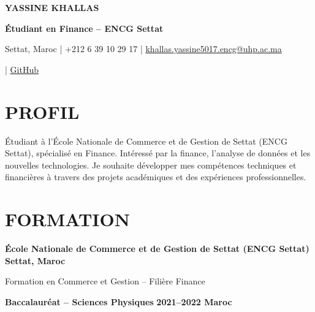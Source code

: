 \documentclass[10pt,a4paper]{article}
\begin{document}

\begin{center}

{\Huge\textbf{YASSINE KHALLAS}}

\vspace{3pt}

{\large\textbf{Étudiant en Finance -- ENCG Settat}}

\vspace{7pt}

Settat, Maroc
\quad | \quad
+212 6 39 10 29 17
\quad | \quad
\href{mailto:votre.email@gmail.com}{khallas.yassine5017.encg@uhp.ac.ma}

\vspace{2pt}

\quad | \quad
\href{https://github.com/votreprofil}{GitHub}

\end{center}

\section{PROFIL}

Étudiant à l'École Nationale de Commerce et de Gestion de Settat
(ENCG Settat), spécialisé en Finance. Intéressé par la finance,
l'analyse de données et les nouvelles technologies. Je souhaite
développer mes compétences techniques et financières à travers
des projets académiques et des expériences professionnelles.

\section{FORMATION}

\textbf{École Nationale de Commerce et de Gestion de Settat (ENCG Settat)}
\hfill \textbf{Settat, Maroc}

Formation en Commerce et Gestion -- Filière Finance

\vspace{3pt}

\textbf{Baccalauréat -- Sciences Physiques}
\hfill \textbf{2021--2022 Maroc}



\end{document}
